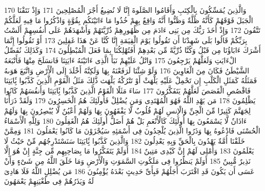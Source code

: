 \documentclass[20pt,a4paper]{article}
\begin{document}
{\tiny\colorbox{cl_aya}{170}} وَالَّذِينَ يُمَسِّكُونَ بِالْكِتَبِ وَأَقَامُوا الصَّلَوةَ إِنَّا لَا نُضِيعُ أَجْرَ الْمُصْلِحِينَ
{\tiny\colorbox{cl_aya}{171}} وَإِذْ نَتَقْنَا الْجَبَلَ فَوْقَهُمْ كَأَنَّهُ ظُلَّةٌ وَظَنُّوا أَنَّهُ وَاقِعٌ بِهِمْ خُذُوا مَا ءَاتَيْنَكُم بِقُوَّةٍ وَاذْكُرُوا مَا فِيهِ لَعَلَّكُمْ تَتَّقُونَ
{\tiny\colorbox{cl_aya}{172}} وَإِذْ أَخَذَ رَبُّكَ مِن بَنِى ءَادَمَ مِن ظُهُورِهِمْ ذُرِّيَّتَهُمْ وَأَشْهَدَهُمْ عَلَى أَنفُسِهِمْ أَلَسْتُ بِرَبِّكُمْ قَالُوا بَلَى شَهِدْنَا أَن تَقُولُوا يَوْمَ الْقِيَمَةِ إِنَّا كُنَّا عَنْ هَذَا غَفِلِينَ
{\tiny\colorbox{cl_aya}{173}} أَوْ تَقُولُوا إِنَّمَا أَشْرَكَ ءَابَاؤُنَا مِن قَبْلُ وَكُنَّا ذُرِّيَّةً مِّن بَعْدِهِمْ أَفَتُهْلِكُنَا بِمَا فَعَلَ الْمُبْطِلُونَ
{\tiny\colorbox{cl_aya}{174}} وَكَذَلِكَ نُفَصِّلُ الْءَايَتِ وَلَعَلَّهُمْ يَرْجِعُونَ
{\tiny\colorbox{cl_aya}{175}} وَاتْلُ عَلَيْهِمْ نَبَأَ الَّذِى ءَاتَيْنَهُ ءَايَتِنَا فَانسَلَخَ مِنْهَا فَأَتْبَعَهُ الشَّيْطَنُ فَكَانَ مِنَ الْغَاوِينَ
{\tiny\colorbox{cl_aya}{176}} وَلَوْ شِئْنَا لَرَفَعْنَهُ بِهَا وَلَكِنَّهُ أَخْلَدَ إِلَى الْأَرْضِ وَاتَّبَعَ هَوَىهُ فَمَثَلُهُ كَمَثَلِ الْكَلْبِ إِن تَحْمِلْ عَلَيْهِ يَلْهَثْ أَوْ تَتْرُكْهُ يَلْهَث ذَّلِكَ مَثَلُ الْقَوْمِ الَّذِينَ كَذَّبُوا بَِٔايَتِنَا فَاقْصُصِ الْقَصَصَ لَعَلَّهُمْ يَتَفَكَّرُونَ
{\tiny\colorbox{cl_aya}{177}} سَاءَ مَثَلًا الْقَوْمُ الَّذِينَ كَذَّبُوا بَِٔايَتِنَا وَأَنفُسَهُمْ كَانُوا يَظْلِمُونَ
{\tiny\colorbox{cl_aya}{178}} مَن يَهْدِ اللَّهُ فَهُوَ الْمُهْتَدِى وَمَن يُضْلِلْ فَأُولَئِكَ هُمُ الْخَسِرُونَ
{\tiny\colorbox{cl_aya}{179}} وَلَقَدْ ذَرَأْنَا لِجَهَنَّمَ كَثِيرًا مِّنَ الْجِنِّ وَالْإِنسِ لَهُمْ قُلُوبٌ لَّا يَفْقَهُونَ بِهَا وَلَهُمْ أَعْيُنٌ لَّا يُبْصِرُونَ بِهَا وَلَهُمْ ءَاذَانٌ لَّا يَسْمَعُونَ بِهَا أُولَئِكَ كَالْأَنْعَمِ بَلْ هُمْ أَضَلُّ أُولَئِكَ هُمُ الْغَفِلُونَ
{\tiny\colorbox{cl_aya}{180}} وَلِلَّهِ الْأَسْمَاءُ الْحُسْنَى فَادْعُوهُ بِهَا وَذَرُوا الَّذِينَ يُلْحِدُونَ فِى أَسْمَئِهِ سَيُجْزَوْنَ مَا كَانُوا يَعْمَلُونَ
{\tiny\colorbox{cl_aya}{181}} وَمِمَّنْ خَلَقْنَا أُمَّةٌ يَهْدُونَ بِالْحَقِّ وَبِهِ يَعْدِلُونَ
{\tiny\colorbox{cl_aya}{182}} وَالَّذِينَ كَذَّبُوا بَِٔايَتِنَا سَنَسْتَدْرِجُهُم مِّنْ حَيْثُ لَا يَعْلَمُونَ
{\tiny\colorbox{cl_aya}{183}} وَأُمْلِى لَهُمْ إِنَّ كَيْدِى مَتِينٌ
{\tiny\colorbox{cl_aya}{184}} أَوَلَمْ يَتَفَكَّرُوا مَا بِصَاحِبِهِم مِّن جِنَّةٍ إِنْ هُوَ إِلَّا نَذِيرٌ مُّبِينٌ
{\tiny\colorbox{cl_aya}{185}} أَوَلَمْ يَنظُرُوا فِى مَلَكُوتِ السَّمَوَتِ وَالْأَرْضِ وَمَا خَلَقَ اللَّهُ مِن شَىْءٍ وَأَنْ عَسَى أَن يَكُونَ قَدِ اقْتَرَبَ أَجَلُهُمْ فَبِأَىِّ حَدِيثٍ بَعْدَهُ يُؤْمِنُونَ
{\tiny\colorbox{cl_aya}{186}} مَن يُضْلِلِ اللَّهُ فَلَا هَادِىَ لَهُ وَيَذَرُهُمْ فِى طُغْيَنِهِمْ يَعْمَهُونَ
\end{document}
